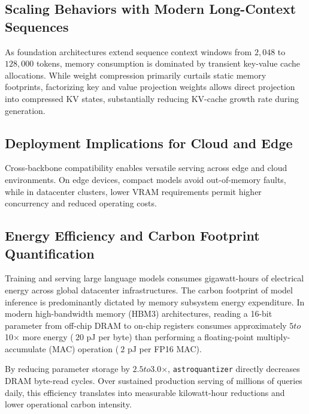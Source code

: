 \subsection{Scaling Behaviors with Modern Long-Context Sequences}
As foundation architectures extend sequence context windows from $2{,}048$ to $128{,}000$ tokens, memory consumption is dominated by transient key-value cache allocations. While weight compression primarily curtails static memory footprints, factorizing key and value projection weights allows direct projection into compressed KV states, substantially reducing KV-cache growth rate during generation.

\subsection{Deployment Implications for Cloud and Edge}
Cross-backbone compatibility enables versatile serving across edge and cloud environments. On edge devices, compact models avoid out-of-memory faults, while in datacenter clusters, lower VRAM requirements permit higher concurrency and reduced operating costs.

\subsection{Energy Efficiency and Carbon Footprint Quantification}
Training and serving large language models consumes gigawatt-hours of electrical energy across global datacenter infrastructures. The carbon footprint of model inference is predominantly dictated by memory subsystem energy expenditure. In modern high-bandwidth memory (HBM3) architectures, reading a 16-bit parameter from off-chip DRAM to on-chip registers consumes approximately $5$\times$ to $10$\times$ more energy ($~20$ pJ per byte) than performing a floating-point multiply-accumulate (MAC) operation ($~2$ pJ per FP16 MAC).

By reducing parameter storage by $2.5$\times$ to $3.0$\times$, \texttt{astroquantizer} directly decreases DRAM byte-read cycles. Over sustained production serving of millions of queries daily, this efficiency translates into measurable kilowatt-hour reductions and lower operational carbon intensity.
